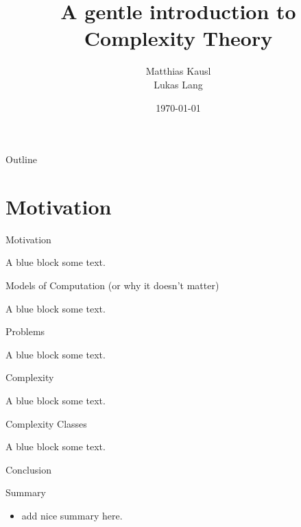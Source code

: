 \documentclass[c]{beamer}
\title{A gentle introduction to Complexity Theory}
\author{Matthias Kausl \\ Lukas Lang}
\institute{Vienna University of Technology}
\date{\today}
\begin{document}
\begin{frame}
\titlepage
\end{frame}

\begin{frame}{Outline}
	\tableofcontents
\end{frame}

\section{Motivation}

\begin{frame}{Motivation}
          
	\begin{block}{A blue block}
		some text.
          \end{block}
\end{frame}

\begin{frame}{Models of Computation (or why it doesn't matter)}
          
	\begin{block}{A blue block}
		some text.
          \end{block}
\end{frame}

\begin{frame}{Problems}
          
	\begin{block}{A blue block}
		some text.
          \end{block}
\end{frame}

\begin{frame}{Complexity}
          
	\begin{block}{A blue block}
		some text.
          \end{block}
\end{frame}

\begin{frame}{Complexity Classes}
          
	\begin{block}{A blue block}
		some text.
          \end{block}
\end{frame}


\begin{frame}{Conclusion}
	\begin{block}{Summary}
		\begin{itemize}
			\item add nice summary here.
		\end{itemize}
	\end{block}
\end{frame}
\end{document}

